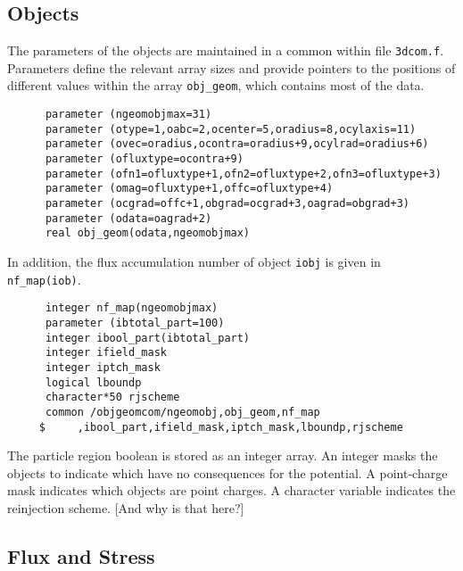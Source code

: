 \documentclass[12pt]{article}
\begin{document}
\subsection{Objects}

The parameters of the objects are maintained in a common within file
\verb!3dcom.f!. Parameters define the relevant array sizes and provide
pointers to the positions of different values within the array
\verb!obj_geom!, which contains most of the data.

\begin{verbatim}
      parameter (ngeomobjmax=31)
      parameter (otype=1,oabc=2,ocenter=5,oradius=8,ocylaxis=11)
      parameter (ovec=oradius,ocontra=oradius+9,ocylrad=oradius+6)
      parameter (ofluxtype=ocontra+9)
      parameter (ofn1=ofluxtype+1,ofn2=ofluxtype+2,ofn3=ofluxtype+3)
      parameter (omag=ofluxtype+1,offc=ofluxtype+4)
      parameter (ocgrad=offc+1,obgrad=ocgrad+3,oagrad=obgrad+3)
      parameter (odata=oagrad+2)
      real obj_geom(odata,ngeomobjmax)
\end{verbatim}
In addition, the flux accumulation number of object \verb!iobj! is
given in \verb!nf_map(iob)!.
\begin{verbatim}
      integer nf_map(ngeomobjmax)
      parameter (ibtotal_part=100)
      integer ibool_part(ibtotal_part)
      integer ifield_mask
      integer iptch_mask
      logical lboundp
      character*50 rjscheme
      common /objgeomcom/ngeomobj,obj_geom,nf_map
     $     ,ibool_part,ifield_mask,iptch_mask,lboundp,rjscheme
\end{verbatim}
The particle region boolean is stored as an integer array. An integer
masks the objects to indicate which have no consequences for the
potential. A point-charge mask indicates which objects are point
charges. A character variable indicates the reinjection scheme. [And
  why is that here?]

\subsection{Flux and Stress}\label{fluxstruct}
\end{document}
